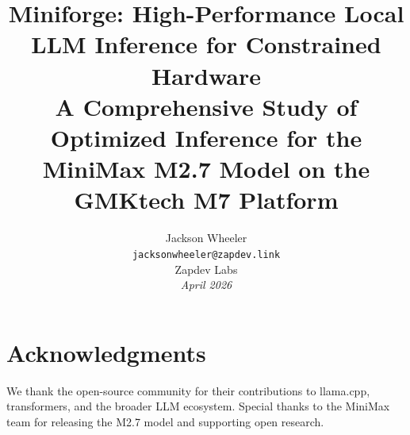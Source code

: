 \documentclass[11pt,a4paper]{article}
\title{
\textbf{Miniforge: High-Performance Local LLM Inference for Constrained Hardware}\\[0.5em]
\large A Comprehensive Study of Optimized Inference for the MiniMax M2.7 Model on the GMKtech M7 Platform
}
\author{
Jackson Wheeler\\
\texttt{jacksonwheeler@zapdev.link}\\
Zapdev Labs\\
\textit{April 2026}
}
\date{}
\begin{document}
\maketitle

\begin{abstract}

\end{abstract}

\newpage

{
\small
\setcounter{tocdepth}{1}
\tableofcontents
}
\newpage

\listoffigures
\newpage

\listoftables
\newpage


















\section*{Acknowledgments}
We thank the open-source community for their contributions to llama.cpp, transformers, and the broader LLM ecosystem. Special thanks to the MiniMax team for releasing the M2.7 model and supporting open research.

\newpage



\newpage
\appendix



\end{document}

